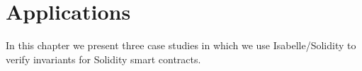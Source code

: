 \documentclass[10pt,DIV17,a4paper,abstract=true,twoside=semi,openright]
{scrreprt}
\begin{document}


\chapter{Applications}

In this chapter we present three case studies in which we use Isabelle/Solidity to verify
invariants for Solidity smart contracts.











%    
\end{document}
